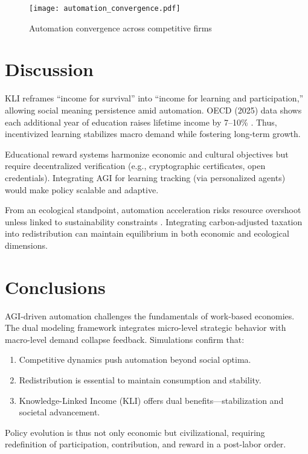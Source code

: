 \documentclass[10pt,a4paper]{article}
\begin{document}
\begin{figure}[h]
\centering
\texttt{[image: automation\_convergence.pdf]}
\caption{Automation convergence across competitive firms}
\end{figure}

\section{Discussion}
KLI reframes “income for survival” into “income for learning and participation,” allowing social meaning persistence amid automation. OECD (2025) data shows each additional year of education raises lifetime income by 7–10\% \cite{OECDedu2025}. Thus, incentivized learning stabilizes macro demand while fostering long-term growth.

Educational reward systems harmonize economic and cultural objectives but require decentralized verification (e.g., cryptographic certificates, open credentials). Integrating AGI for learning tracking (via personalized agents) would make policy scalable and adaptive.

From an ecological standpoint, automation acceleration risks resource overshoot unless linked to sustainability constraints \cite{Era2024}. Integrating carbon-adjusted taxation into redistribution can maintain equilibrium in both economic and ecological dimensions.

\section{Conclusions}
AGI-driven automation challenges the fundamentals of work-based economies. The dual modeling framework integrates micro-level strategic behavior with macro-level demand collapse feedback. Simulations confirm that:
\begin{enumerate}
    \item Competitive dynamics push automation beyond social optima.
    \item Redistribution is essential to maintain consumption and stability.
    \item Knowledge-Linked Income (KLI) offers dual benefits—stabilization and societal advancement.
\end{enumerate}

Policy evolution is thus not only economic but civilizational, requiring redefinition of participation, contribution, and reward in a post-labor order.



\end{document}
